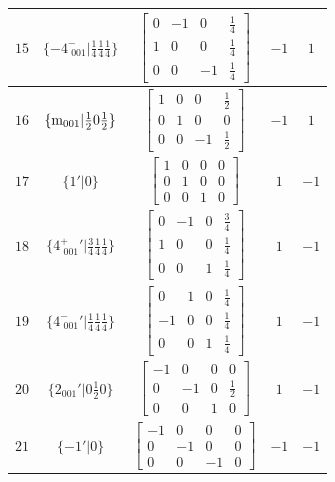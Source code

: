 \documentclass[fleqn,8pt]{jsarticle}
\begin{document}
\begin{longtable}{ccccc}
$ 15 $ & $ \{-4^{-}_{\,\,001}|\frac{1}{4} \frac{1}{4} \frac{1}{4}\} $ & $ \begin{bmatrix} 0 & -1 & 0 & \frac{1}{4} \\ 1 & 0 & 0 & \frac{1}{4} \\ 0 & 0 & -1 & \frac{1}{4} \end{bmatrix} $ & $ -1 $ & $ 1 $ \\ \hline
$ 16 $ & $ \{{\rm m}_{001}|\frac{1}{2} 0 \frac{1}{2}\} $ & $ \begin{bmatrix} 1 & 0 & 0 & \frac{1}{2} \\ 0 & 1 & 0 & 0 \\ 0 & 0 & -1 & \frac{1}{2} \end{bmatrix} $ & $ -1 $ & $ 1 $ \\ \hline
$ 17 $ & $ \{1{}'|0\} $ & $ \begin{bmatrix} 1 & 0 & 0 & 0 \\ 0 & 1 & 0 & 0 \\ 0 & 0 & 1 & 0 \end{bmatrix} $ & $ 1 $ & $ -1 $ \\ \hline
$ 18 $ & $ \{4^{+}_{\,\,001}{}'|\frac{3}{4} \frac{1}{4} \frac{1}{4}\} $ & $ \begin{bmatrix} 0 & -1 & 0 & \frac{3}{4} \\ 1 & 0 & 0 & \frac{1}{4} \\ 0 & 0 & 1 & \frac{1}{4} \end{bmatrix} $ & $ 1 $ & $ -1 $ \\ \hline
$ 19 $ & $ \{4^{-}_{\,\,001}{}'|\frac{1}{4} \frac{1}{4} \frac{1}{4}\} $ & $ \begin{bmatrix} 0 & 1 & 0 & \frac{1}{4} \\ -1 & 0 & 0 & \frac{1}{4} \\ 0 & 0 & 1 & \frac{1}{4} \end{bmatrix} $ & $ 1 $ & $ -1 $ \\ \hline
$ 20 $ & $ \{2{}_{001}{}'|0 \frac{1}{2} 0\} $ & $ \begin{bmatrix} -1 & 0 & 0 & 0 \\ 0 & -1 & 0 & \frac{1}{2} \\ 0 & 0 & 1 & 0 \end{bmatrix} $ & $ 1 $ & $ -1 $ \\ \hline
$ 21 $ & $ \{-1{}'|0\} $ & $ \begin{bmatrix} -1 & 0 & 0 & 0 \\ 0 & -1 & 0 & 0 \\ 0 & 0 & -1 & 0 \end{bmatrix} $ & $ -1 $ & $ -1 $ \\ \hline

\end{longtable}
\end{document}
